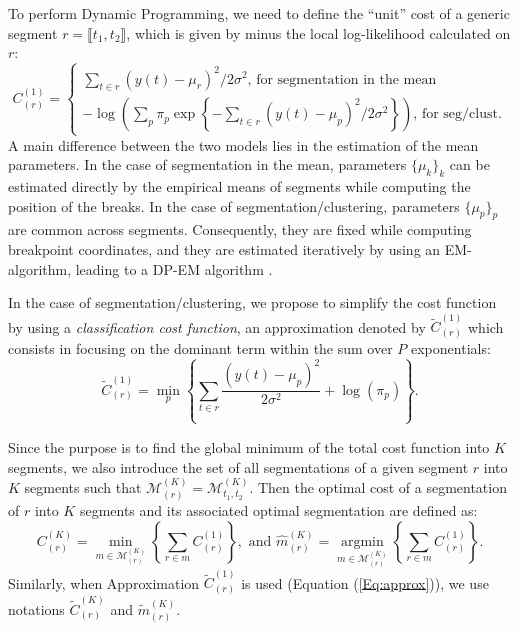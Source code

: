 \documentclass[11pt]{llncs}
\begin{document}
To perform Dynamic Programming, we need to define the ``unit'' cost of a generic segment $r = \llbracket t_1, t_2 \rrbracket$, which is given by minus the local log-likelihood calculated on $r$:
$$ C_{(r)}^{(1)} = 
\begin{cases}
\sum_{t \in r} (y(t) - \mu_r)^2/2 \sigma^2 \text{, for segmentation in the mean}  \\
-\log\left(\sum_p \pi_p \exp \left\{ - \sum_{t \in r} (y(t) - \mu_p)^2 / 2 \sigma^2 \right\}\right) \text{, for seg/clust}.
\end{cases}
$$ 
A main difference between the two models lies in the estimation of the mean parameters. In the case of segmentation in the mean, parameters $\{\mu_k\}_k$ can be estimated directly by the empirical means of segments while computing the position of the breaks. In the case of segmentation/clustering, parameters $\{\mu_p\}_p$ are common across segments. Consequently, they are fixed while computing breakpoint coordinates, and they are estimated iteratively by using an EM-algorithm, leading to a DP-EM algorithm \cite{picard_2007}. 

In the case of segmentation/clustering, we propose to simplify the cost function by using a \textit{classification cost function}, an approximation denoted by $\widetilde{C}_{(r)}^{(1)}$ which consists in focusing on the dominant term within the sum over $P$ exponentials:
\begin{equation}
\label{Eq:approx}
\widetilde{C}_{(r)}^{(1)}= \min_p \left\{ \sum_{t \in r}\frac{(y(t) - \mu_p)^2} {2\sigma^2 } + \log(\pi_p)\right\}.
\end{equation}

Since the purpose is to find the global minimum of the total cost function into $K$ segments, we also introduce the set of all segmentations of a given segment $r$ into $K$ segments such that $\mathcal{M}^{(K)}_{(r)} = \mathcal{M}^{(K)}_{t_1, t_2}$. Then the optimal cost of a segmentation of $r$ into $K$ segments and its associated optimal segmentation are defined as:
$$
C_{(r)}^{(K)} = \min_{m \in \mathcal{M}^{(K)}_{(r)}} \left\{ \sum_{r \in m} C^{(1)}_{(r)} \right\}, 
\text{ and }
\widehat{m}_{(r)}^{(K)} = \underset{m \in \mathcal{M}^{(K)}_{(r)}}{\operatorname{argmin}} \left\{ \sum_{r \in m} C^{(1)}_{(r)} \right\}.
$$
Similarly, when Approximation $\widetilde{C}_{(r)}^{(1)}$ is used (Equation (\ref{Eq:approx})), we use notations $\widetilde{C}_{(r)}^{(K)}$ and $\widetilde{m}_{(r)}^{(K)}$.
\end{document}
